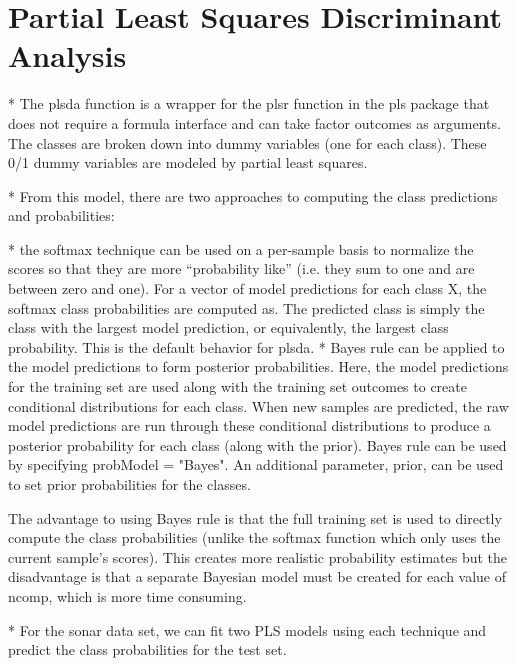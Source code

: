 \documentclass[caret-main.tex]{subfiles}
\begin{document}
\section{Partial Least Squares Discriminant Analysis}


* The plsda function is a wrapper for the plsr function in the pls package that does not require a formula interface and can take factor outcomes as arguments. The classes are broken down into dummy variables (one for each class). These 0/1 dummy variables are modeled by partial least squares.

* From this model, there are two approaches to computing the class predictions and probabilities:
\begin{enumerate}
* the softmax technique can be used on a per-sample basis to normalize the scores so that they are more ``probability like'' (i.e. they sum to one and are between zero and one). For a vector of model predictions for each class X, the softmax class probabilities are computed as. The predicted class is simply the class with the largest model prediction, or equivalently, the largest class probability. This is the default behavior for plsda.
* Bayes rule can be applied to the model predictions to form posterior probabilities. Here, the model predictions for the training set are used along with the training set outcomes to create conditional distributions for each class. When new samples are predicted, the raw model predictions are run through these conditional distributions to produce a posterior probability for each class (along with the prior). Bayes rule can be used by specifying probModel = "Bayes". An additional parameter, prior, can be used to set prior probabilities for the classes.

The advantage to using Bayes rule is that the full training set is used to directly compute the class probabilities (unlike the softmax function which only uses the current sample's scores). 
This creates more realistic probability estimates but the disadvantage is that a separate Bayesian model must be created for each value of ncomp, which is more time consuming.

* For the sonar data set, we can fit two PLS models using each technique and predict the class probabilities 
for the test set.



\end{enumerate}
\end{document}
